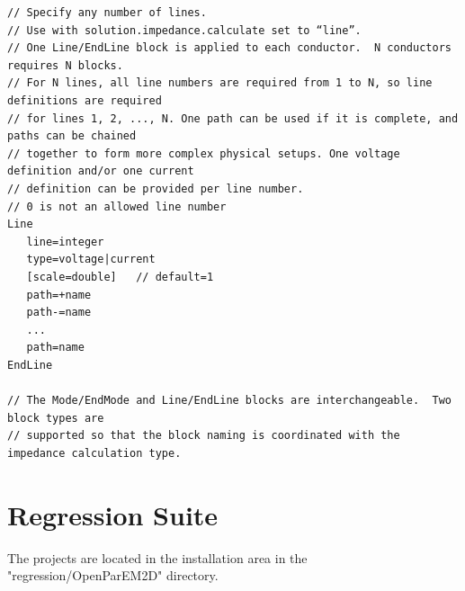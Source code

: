 \documentclass[titlepage]{article}
\renewcommand\_{\textunderscore\linebreak[1]}
\begin{document}
\begin{Verbatim}[fontsize=\small]
// Specify any number of lines.
// Use with solution.impedance.calculate set to “line”.
// One Line/EndLine block is applied to each conductor.  N conductors requires N blocks.
// For N lines, all line numbers are required from 1 to N, so line definitions are required
// for lines 1, 2, ..., N. One path can be used if it is complete, and paths can be chained
// together to form more complex physical setups. One voltage definition and/or one current
// definition can be provided per line number.
// 0 is not an allowed line number
Line
   line=integer 
   type=voltage|current
   [scale=double]   // default=1
   path=+name
   path-=name
   ...
   path=name
EndLine

// The Mode/EndMode and Line/EndLine blocks are interchangeable.  Two block types are 
// supported so that the block naming is coordinated with the impedance calculation type.
\end{Verbatim}

\newpage
\section{Regression Suite}
\label{sec:regression_suite}

The projects are located in the installation area in the "regression/OpenParEM2D" directory.
\end{document}
